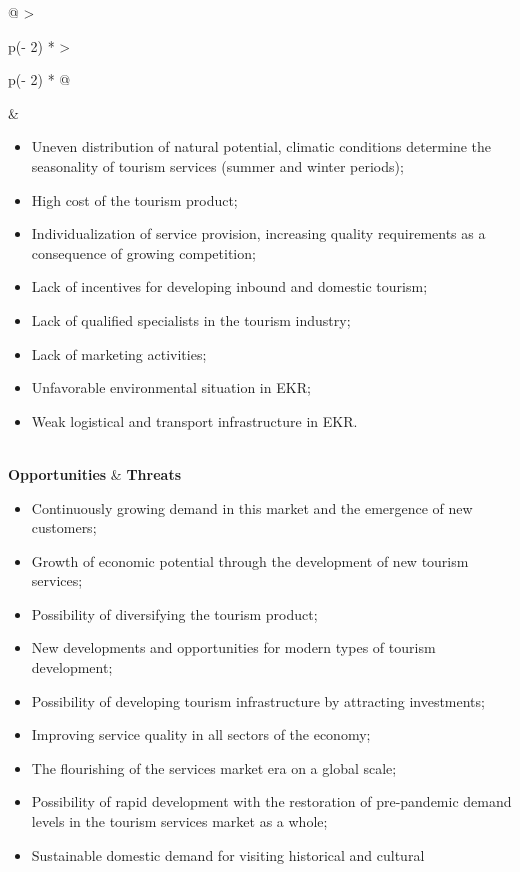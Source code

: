 \begin{longtable}[]{@{}
  >{\raggedright\arraybackslash}p{(\columnwidth - 2\tabcolsep) * }
  >{\raggedright\arraybackslash}p{(\columnwidth - 2\tabcolsep) * }@{}}
\begin{minipage}[t]{\linewidth}
\end{minipage} & \begin{minipage}[t]{\linewidth}\raggedright
\begin{itemize}
\item
  Uneven distribution of natural potential, climatic conditions
  determine the seasonality of tourism services (summer and winter
  periods);
\item
  High cost of the tourism product;
\item
  Individualization of service provision, increasing quality
  requirements as a consequence of growing competition;
\item
  Lack of incentives for developing inbound and domestic tourism;
\item
  Lack of qualified specialists in the tourism industry;
\item
  Lack of marketing activities;
\item
  Unfavorable environmental situation in EKR;
\item
  Weak logistical and transport infrastructure in EKR.
\end{itemize}
\end{minipage} \\
{\bfseries Opportunities} & {\bfseries Threats} \\
\begin{minipage}[t]{\linewidth}\raggedright
\begin{itemize}
\item
  Continuously growing demand in this market and the emergence of new
  customers;
\item
  Growth of economic potential through the development of new tourism
  services;
\item
  Possibility of diversifying the tourism product;
\item
  New developments and opportunities for modern types of tourism
  development;
\item
  Possibility of developing tourism infrastructure by attracting
  investments;
\item
  Improving service quality in all sectors of the economy;
\item
  The flourishing of the services market era on a global scale;
\item
  Possibility of rapid development with the restoration of pre-pandemic
  demand levels in the tourism services market as a whole;
\item
  Sustainable domestic demand for visiting historical and cultural

\end{itemize}
\end{minipage}
\end{longtable}
